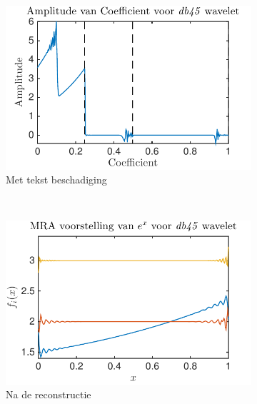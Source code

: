\begin{figure}
    \centering
    \begin{subfigure}[b]{0.45\textwidth}
        \includegraphics[width=\textwidth]{../src/denoising/db45_noNoise/coef_exp_db45_2}
        \caption{Met tekst beschadiging}
        \label{fig:tiger}
    \end{subfigure}
    ~ %
    \begin{subfigure}[b]{0.45\textwidth}
        \includegraphics[width=\textwidth]{../src/denoising/db45_noNoise/MRA_exp_db45_2}
        \caption{Na de reconstructie}
        \label{fig:mouse}
    \end{subfigure}
    \begin{subfigure}[b]{0.45\textwidth}

\end{subfigure}
\end{figure}
